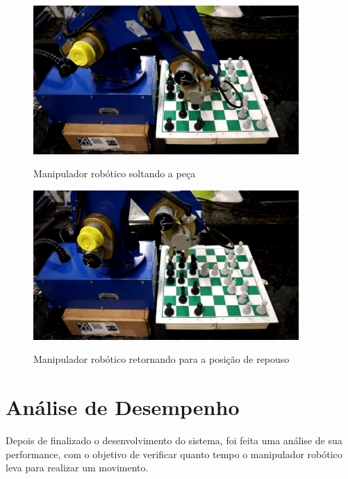 \begin{figure}[H]
    \centering
    \caption{Manipulador robótico soltando a peça}
    \includegraphics[keepaspectratio=true, width=0.9\textwidth]
    	{img/soltando-peca.png}
    \label{fig:manipuladorSoltandoPeça}
\end{figure}

\begin{figure}[H]
    \centering
    \caption{Manipulador robótico retornando para a posição de repouso}
    \includegraphics[keepaspectratio=true, width=0.9\textwidth]
    	{img/retornando-repouso.png}
    \label{fig:manipuladorRetornandoRepouso}
\end{figure}

\section[Análise de Desempenho]{Análise de Desempenho}
\label{sec:implementacaoLogicaXadrez}

Depois de finalizado o desenvolvimento do sistema, foi feita uma análise de sua performance,
com o objetivo de verificar quanto tempo o manipulador robótico leva para realizar um movimento.

